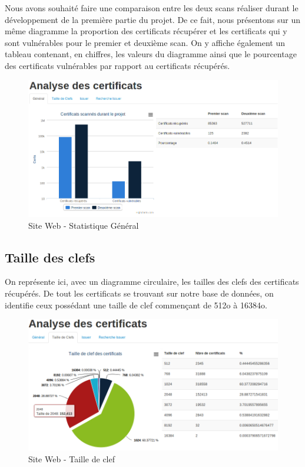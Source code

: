 Nous avons souhaité faire une comparaison entre les deux scans réaliser durant le développement de la première partie du projet. De ce fait, nous présentons sur un même diagramme la proportion des certificats récupérer et les certificats qui y sont vulnérables pour le premier et deuxième scan. On y affiche également un tableau contenant, en chiffres, les valeurs du diagramme ainsi que le pourcentage des certificats vulnérables par rapport au certificats récupérés.

\begin{figure}[H]
\begin{center}
\includegraphics[scale=0.5]{images/site_web_stats_gen.png}
\end{center}
\caption{Site Web - Statistique Général}
\label{stats_general}
\end{figure}

\subsection{Taille des clefs}

On représente ici, avec un diagramme circulaire, les tailles des clefs des certificats récupérés. De tout les certificats se trouvant sur notre base de données, on identifie ceux possédant une taille de clef commençant de 512o à 16384o.

\begin{figure}[H]
\begin{center}
\includegraphics[scale=0.5]{images/site_web_stats_clefs.png}
\end{center}
\caption{Site Web - Taille de clef}
\label{taille_clefs}
\end{figure}

